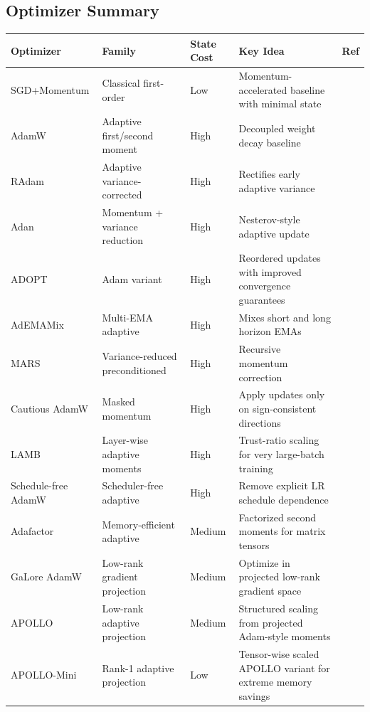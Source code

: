 \documentclass[11pt,a4paper]{article}
\begin{document}
\subsection{Optimizer Summary}
\small
\begin{longtable}{p{2.2cm}p{2.8cm}p{2.0cm}p{5.4cm}p{1.8cm}}
\toprule
\textbf{Optimizer} & \textbf{Family} & \textbf{State Cost} & \textbf{Key Idea} & \textbf{Ref} \\
\midrule
\endhead
SGD+Momentum & Classical first-order & Low & Momentum-accelerated baseline with minimal state & \citep{polyak_1964} \\
AdamW & Adaptive first/second moment & High & Decoupled weight decay baseline & \citep{loshchilov_decoupled_2017} \\
RAdam & Adaptive variance-corrected & High & Rectifies early adaptive variance & \citep{liu_variance_2019} \\
Adan & Momentum + variance reduction & High & Nesterov-style adaptive update & \citep{xie_adan_2022} \\
ADOPT & Adam variant & High & Reordered updates with improved convergence guarantees & \citep{taniguchi_adopt_2024} \\
AdEMAMix & Multi-EMA adaptive & High & Mixes short and long horizon EMAs & \citep{pagliardini_ademamix_2024} \\
MARS & Variance-reduced preconditioned & High & Recursive momentum correction & \citep{yuan_mars_2024} \\
Cautious AdamW & Masked momentum & High & Apply updates only on sign-consistent directions & \citep{liang_cautious_2024} \\
LAMB & Layer-wise adaptive moments & High & Trust-ratio scaling for very large-batch training & \citep{you_largebatch_2020} \\
Schedule-free AdamW & Scheduler-free adaptive & High & Remove explicit LR schedule dependence & \citep{defazio_road_2024} \\
Adafactor & Memory-efficient adaptive & Medium & Factorized second moments for matrix tensors & \citep{shazeer_adafactor_2018} \\
GaLore AdamW & Low-rank gradient projection & Medium & Optimize in projected low-rank gradient space & \citep{zhao_galore_2024} \\
APOLLO & Low-rank adaptive projection & Medium & Structured scaling from projected Adam-style moments & \citep{zhu2025apollosgdlikememoryadamwlevel} \\
APOLLO-Mini & Rank-1 adaptive projection & Low & Tensor-wise scaled APOLLO variant for extreme memory savings & \citep{zhu2025apollosgdlikememoryadamwlevel} \\

\end{longtable}
\end{document}
